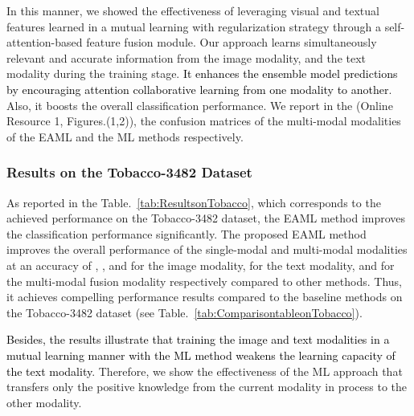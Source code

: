 \documentclass[twocolumn]{svjour3}
\begin{document}
In this manner, we showed the effectiveness of leveraging visual and textual features learned in a mutual learning with regularization strategy through a self-attention-based feature fusion module. Our approach learns simultaneously relevant and accurate information from the image modality, and the text modality during the training stage. \textcolor{black}{It enhances the ensemble model predictions by encouraging attention collaborative learning from one modality to another}. Also, it boosts the overall classification performance.
We report in the (Online Resource 1, Figures.(1,2)), the confusion matrices of the multi-modal modalities of the EAML and the ML methods respectively.

\subsubsection{Results on the Tobacco-3482 Dataset}

As reported in the Table.~\ref{tab:ResultsonTobacco}, which corresponds to the achieved performance on the Tobacco-3482 dataset, the EAML method improves the classification performance significantly. 
The proposed EAML method improves the overall performance of the single-modal and multi-modal modalities at an accuracy of , , and  for the image modality, for the text modality, and for the multi-modal fusion modality respectively compared to other methods. Thus, it achieves compelling performance results compared to the baseline methods on the Tobacco-3482 dataset (see Table.~\ref{tab:ComparisontableonTobacco}).

\textcolor{black}{Besides, the results illustrate that training the image and text modalities in a mutual learning manner with the ML method weakens the learning capacity of the text modality}. Therefore, we show the effectiveness of the ML approach that transfers only the positive knowledge from the current modality in process to the other modality.
\end{document}
